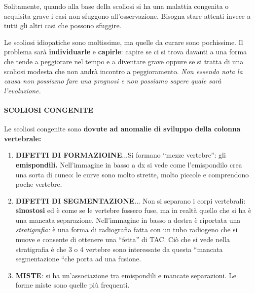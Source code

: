 \begin{enumerate}
\end{enumerate}

Solitamente, quando alla base della scoliosi si ha una malattia
congenita o acquisita grave i casi non sfuggono all'osservazione.
Bisogna stare attenti invece a tutti gli altri casi che possono
sfuggire.

Le scoliosi idiopatiche sono moltissime, ma quelle da curare sono
pochissime. Il problema sarà \textbf{individuarle} e \textbf{capirle}:
capire se ci si trova davanti a una forma che tende a peggiorare nel
tempo e a diventare grave oppure se si tratta di una scoliosi modesta
che non andrà incontro a peggioramento. \emph{Non essendo nota la causa
non possiamo fare una prognosi e non possiamo sapere quale sarà
l'evoluzione. }

\paragraph{SCOLIOSI CONGENITE}


Le scoliosi congenite sono \textbf{dovute ad anomalie di sviluppo della
colonna vertebrale:}

\begin{enumerate}
\def\labelenumi{\arabic{enumi}.}
\item
  \textbf{DIFETTI DI FORMAZIOINE}...Si formano ``mezze vertebre'': gli
  \textbf{emispondili.} Nell'immagine in basso a dx si vede come
  l'emispondilo crea una sorta di cuneo: le curve sono molto strette,
  molto piccole e comprendono poche vertebre.
\item
  \textbf{DIFETTI DI SEGMENTAZIONE}... Non si separano i corpi
  vertebrali: \textbf{sinostosi} ed è come se le vertebre fossero fuse,
  ma in realtà quello che si ha è una mancata separazione. Nell'immagine
  in basso a destra è riportata una \emph{stratigrafia:} è una forma di
  radiografia fatta con un tubo radiogeno che si muove e consente di
  ottenere una ``fetta'' di TAC. Ciò che si vede nella stratigrafia è
  che 3 o 4 vertebre sono interessate da questa ``mancata segmentazione
  ``che porta ad una fusione.
\item
  \textbf{MISTE}: si ha un'associazione tra emispondili e mancate
  separazioni. Le forme miste sono quelle più frequenti.
\end{enumerate}


